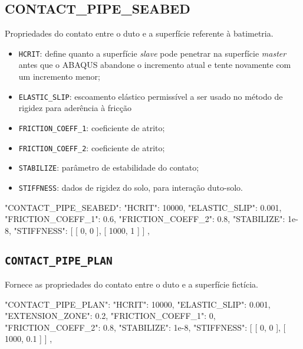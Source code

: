 \subsection{CONTACT\_PIPE\_SEABED}


Propriedades do contato entre o duto e a superfície referente à batimetria.

\begin{itemize}
  \item \texttt{HCRIT}: define quanto a superfície \textit{slave} pode penetrar na superfície \textit{master} antes que o ABAQUS abandone o incremento atual e tente novamente com um incremento menor;
  \item \texttt{ELASTIC\_SLIP}: escoamento elástico permissível a ser usado no método de rigidez para aderência à fricção
  \item \texttt{FRICTION\_COEFF\_1}: coeficiente de atrito;
  \item \texttt{FRICTION\_COEFF\_2}: coeficiente de atrito;
  \item \texttt{STABILIZE}: parâmetro de estabilidade do contato;
  \item \texttt{STIFFNESS}: dados de rigidez do solo, para interação duto-solo.
\end{itemize}

\begin{jsoncode}
{
  "CONTACT_PIPE_SEABED": {
    "HCRIT": 10000,
    "ELASTIC_SLIP": 0.001,
    "FRICTION_COEFF_1": 0.6,
    "FRICTION_COEFF_2": 0.8,
    "STABILIZE": 1e-8,
    "STIFFNESS": [
      [
        0,
        0
      ],
      [
        1000,
        1
      ]
    ]
  },
}
\end{jsoncode}


\subsection{\texttt{CONTACT\_PIPE\_PLAN}}

Fornece as propriedades do contato entre o duto e a superfície fictícia.

\begin{jsoncode}
{
  "CONTACT_PIPE_PLAN": {
    "HCRIT": 10000,
    "ELASTIC_SLIP": 0.001,
    "EXTENSION_ZONE": 0.2,
    "FRICTION_COEFF_1": 0,
    "FRICTION_COEFF_2": 0.8,
    "STABILIZE": 1e-8,
    "STIFFNESS": [
      [
        0,
        0
      ],
      [
        1000,
        0.1
      ]
    ]
  },
}
\end{jsoncode}


